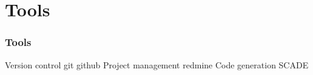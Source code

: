 \documentclass{beamer}
\theoremstyle{definition} \newtheorem{mdefinition}{Definition}
\theoremstyle{plain} \newtheorem{mtheorem}{Theorem}
\theoremstyle{plain} \newtheorem{mcorollary}{Corollary}
\theoremstyle{plain} \newtheorem{mfact}{Fact}
\begin{document}
\section{Tools}

\begin{frame}
	\frametitle{Tools}

	Version control  git github 
	Project management  redmine  
	Code generation  SCADE 

\end{frame}

\end{document}
